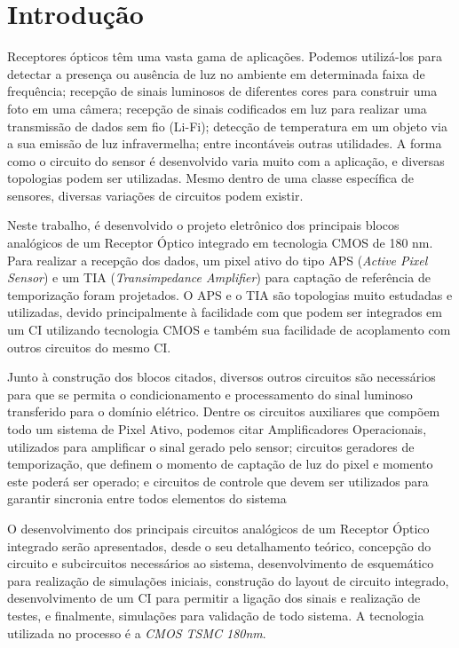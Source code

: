 \chapter[Introdução]{Introdução}
Receptores ópticos têm uma vasta gama de aplicações. Podemos utilizá-los para detectar a presença ou ausência de luz no ambiente em determinada faixa de frequência; recepção de sinais luminosos de diferentes cores para construir uma foto em uma câmera; recepção de sinais codificados em luz para realizar uma transmissão de dados sem fio (Li-Fi); detecção de temperatura em um objeto via a sua emissão de luz infravermelha; entre incontáveis outras utilidades. A forma como o circuito do sensor é desenvolvido varia muito com a aplicação, e diversas topologias podem ser utilizadas. Mesmo dentro de uma classe específica de sensores, diversas variações de circuitos podem existir.

Neste trabalho, é desenvolvido o projeto eletrônico dos principais blocos analógicos de um Receptor \'Optico integrado em tecnologia CMOS de 180 nm. Para realizar a recepção dos dados, um pixel ativo do tipo APS (\textit{Active Pixel Sensor}) e um TIA (\textit{Transimpedance Amplifier}) para captação de refer\^encia de temporização foram projetados. O APS e o TIA são topologias muito estudadas e utilizadas, devido principalmente à facilidade com que podem ser integrados em um CI utilizando tecnologia CMOS e também sua facilidade de acoplamento com outros circuitos do mesmo CI.

Junto à construção dos blocos citados, diversos outros circuitos são necessários para que se permita o condicionamento e processamento do sinal luminoso transferido para o domínio elétrico. Dentre os circuitos auxiliares que compõem todo um sistema de Pixel Ativo, podemos citar Amplificadores Operacionais, utilizados para amplificar o sinal gerado pelo sensor; circuitos geradores de temporização, que definem o momento de captação de luz do pixel e momento este poderá ser operado; e circuitos de controle que devem ser utilizados para garantir sincronia entre todos elementos do sistema

O desenvolvimento dos principais circuitos analógicos de um Receptor Óptico integrado serão apresentados, desde o seu detalhamento teórico, concepção do circuito e subcircuitos necessários ao sistema, desenvolvimento de esquemático para realização de simulações iniciais, construção do layout de circuito integrado, desenvolvimento de um CI para permitir a ligação dos sinais e realização de testes, e finalmente, simulações para validação de todo sistema. A tecnologia utilizada no processo é a \textit{CMOS TSMC 180nm}.

